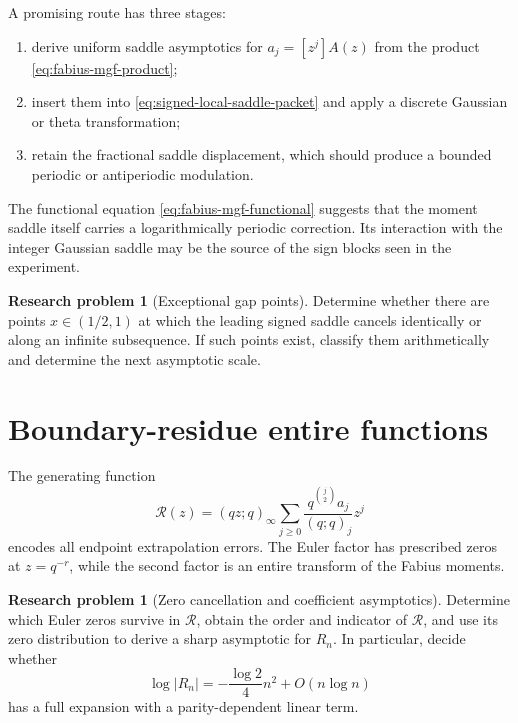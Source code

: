 \documentclass[11pt,oneside]{book}
\numberwithin{equation}{chapter}
\theoremstyle{definition}
\newtheorem{problem}[theorem]{Research problem}
\theoremstyle{remark}
\begin{document}
A promising route has three stages:
\begin{enumerate}
\item derive uniform saddle asymptotics for $a_j=[z^j]A(z)$ from the product
      \eqref{eq:fabius-mgf-product};
\item insert them into \eqref{eq:signed-local-saddle-packet} and apply a
      discrete Gaussian or theta transformation;
\item retain the fractional saddle displacement, which should produce a
      bounded periodic or antiperiodic modulation.
\end{enumerate}
The functional equation \eqref{eq:fabius-mgf-functional} suggests that the
moment saddle itself carries a logarithmically periodic correction.  Its
interaction with the integer Gaussian saddle may be the source of the sign
blocks seen in the experiment.

\begin{problem}[Exceptional gap points]
\label{prob:exceptional-gap-points}
Determine whether there are points $x\in(1/2,1)$ at which the leading signed
saddle cancels identically or along an infinite subsequence.  If such points
exist, classify them arithmetically and determine the next asymptotic scale.
\end{problem}

\section{Boundary-residue entire functions}

The generating function
\begin{equation}
 \mathcal R(z)=(qz;q)_\infty
 \sum_{j\ge0}\frac{q^{\binom j2}a_j}{(q;q)_j}z^j
 \label{eq:boundary-residue-entire-function}
\end{equation}
encodes all endpoint extrapolation errors.  The Euler factor has prescribed
zeros at $z=q^{-r}$, while the second factor is an entire transform of the
Fabius moments.

\begin{problem}[Zero cancellation and coefficient asymptotics]
\label{prob:boundary-entire-zeros}
Determine which Euler zeros survive in $\mathcal R$, obtain the order and
indicator of $\mathcal R$, and use its zero distribution to derive a sharp
asymptotic for $R_n$.  In particular, decide whether
\begin{equation}
 \log|R_n|=-\frac{\log2}{4}n^2+O(n\log n)
 \label{eq:boundary-residue-leading-question}
\end{equation}
has a full expansion with a parity-dependent linear term.
\end{problem}
\end{document}
